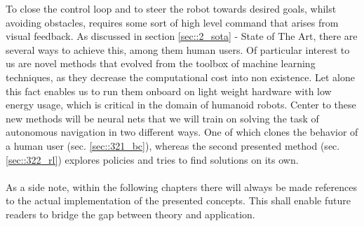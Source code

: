 To close the control loop and to steer the robot towards desired goals, whilst avoiding obstacles, requires some sort of high level command that arises from visual feedback. As discussed in section \ref{sec::2_sota} - State of The Art, there are several ways to achieve this, among them human users. Of particular interest to us are novel methods that evolved from the toolbox of machine learning techniques, as they decrease the computational cost into non existence. Let alone this fact enables us to run them onboard on light weight hardware with low energy usage, which is critical in the domain of humanoid robots. Center to these new methods will be neural nets that we will train on solving the task of autonomous navigation in two different ways. One of which clones the behavior of a human user (sec. \ref{sec::321_bc}), whereas the second presented method (sec. \ref{sec::322_rl}) explores policies and tries to find solutions on its own.
\\\\
As a side note, within the following chapters there will always be made references to the actual implementation of the presented concepts. This shall enable future readers to bridge the gap between theory and application.